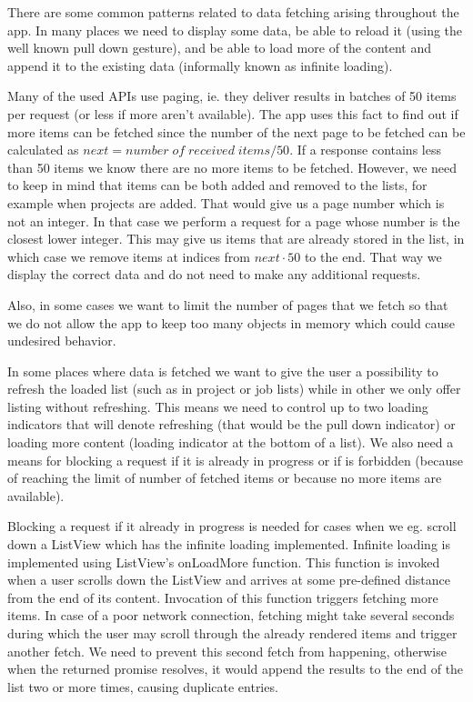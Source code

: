 There are some common patterns related to data fetching arising throughout the app. In many places we need to display some data, be able to reload it (using the well known pull down gesture), and be able to load more of the content and append it to the existing data (informally known as infinite loading).

Many of the used APIs use paging, ie. they deliver results in batches of 50 items per request (or less if more aren't available). The app uses this fact to find out if more items can be fetched since the number of the next page to be fetched can be calculated as $next = number \;of\; received \;items / 50$. If a response contains less than 50 items we know there are no more items to be fetched. However, we need to keep in mind that items can be both added and removed to the lists, for example when projects are added. That would give us a page number which is not an integer. In that case we perform a request for a page whose number is the closest lower integer. This may give us items that are already stored in the list, in which case we remove items at indices from $next \cdot 50$ to the end. That way we display the correct data and do not need to make any additional requests.

Also, in some cases we want to limit the number of pages that we fetch so that we do not allow the app to keep too many objects in memory which could cause undesired behavior. 

In some places where data is fetched we want to give the user a possibility to refresh the loaded list (such as in project or job lists) while in other we only offer listing without refreshing. This means we need to control up to two loading indicators that will denote refreshing (that would be the pull down indicator) or loading more content (loading indicator at the bottom of a list). We also need a means for blocking a request if it is already in progress or if is forbidden (because of reaching the limit of number of fetched items or because no more items are available). 

Blocking a request if it already in progress is needed for cases when we eg. scroll down a ListView which has the infinite loading implemented. Infinite loading is implemented using ListView’s onLoadMore function. This function is invoked when a user scrolls down the ListView and arrives at some pre-defined distance from the end of its content. Invocation of this function triggers fetching more items. In case of a poor network connection, fetching might take several seconds during which the user may scroll through the already rendered items and trigger another fetch. We need to prevent this second fetch from happening, otherwise when the returned promise resolves, it would append the results to the end of the list two or more times, causing duplicate entries.
 
